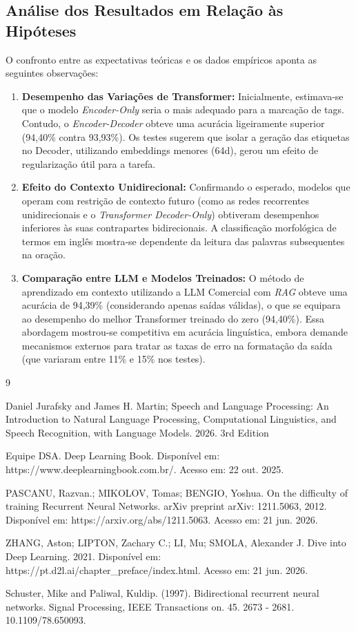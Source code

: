 \documentclass[a4paper,12pt]{article}
\begin{document}
\subsection{Análise dos Resultados em Relação às Hipóteses}

O confronto entre as expectativas teóricas e os dados empíricos aponta as seguintes observações:

\begin{enumerate}
    \item \textbf{Desempenho das Variações de Transformer:} Inicialmente, estimava-se que o modelo \textit{Encoder-Only} seria o mais adequado para a marcação de tags. Contudo, o \textit{Encoder-Decoder} obteve uma acurácia ligeiramente superior (94,40\% contra 93,93\%). Os testes sugerem que isolar a geração das etiquetas no Decoder, utilizando embeddings menores (64d), gerou um efeito de regularização útil para a tarefa.
    \item \textbf{Efeito do Contexto Unidirecional:} Confirmando o esperado, modelos que operam com restrição de contexto futuro (como as redes recorrentes unidirecionais e o \textit{Transformer Decoder-Only}) obtiveram desempenhos inferiores às suas contrapartes bidirecionais. A classificação morfológica de termos em inglês mostra-se dependente da leitura das palavras subsequentes na oração.
    \item \textbf{Comparação entre LLM e Modelos Treinados:} O método de aprendizado em contexto utilizando a LLM Comercial com \textit{RAG} obteve uma acurácia de 94,39\% (considerando apenas saídas válidas), o que se equipara ao desempenho do melhor Transformer treinado do zero (94,40\%). Essa abordagem mostrou-se competitiva em acurácia linguística, embora demande mecanismos externos para tratar as taxas de erro na formatação da saída (que variaram entre 11\% e 15\% nos testes).
\end{enumerate}
\newpage
{}
\begin{thebibliography}{9}

Daniel Jurafsky and James H. Martin; Speech and Language Processing: An Introduction to Natural Language Processing, Computational Linguistics, and Speech Recognition, with Language Models. 2026. 3rd Edition

Equipe DSA. Deep Learning Book. Disponível em: https://www.deeplearningbook.com.br/. Acesso em: 22 out. 2025.

PASCANU, Razvan.; MIKOLOV, Tomas; BENGIO, Yoshua.  On the difficulty of training Recurrent Neural Networks. arXiv preprint arXiv: 1211.5063, 2012. Disponível em: https://arxiv.org/abs/1211.5063. Acesso em: 21 jun. 2026.

ZHANG, Aston; LIPTON, Zachary C.; LI, Mu; SMOLA, Alexander J. Dive into Deep Learning. 2021. Disponível em: https://pt.d2l.ai/chapter\_preface/index.html. Acesso em: 21 jun. 2026.

Schuster, Mike and Paliwal, Kuldip. (1997). Bidirectional recurrent neural networks. Signal Processing, IEEE Transactions on. 45. 2673 - 2681. 10.1109/78.650093.


\end{thebibliography}
\end{document}
